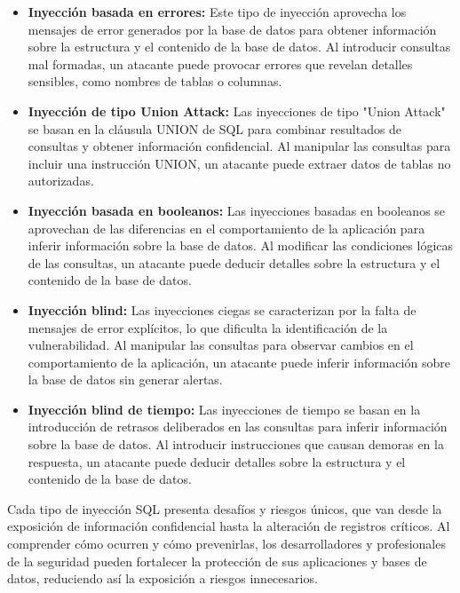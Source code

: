 \documentclass[a4paper,12pt]{article}
\begin{document}
    \begin{itemize}
        \item \textbf{Inyección basada en errores:} Este tipo de inyección aprovecha los mensajes de error generados por la base de datos para obtener información sobre la estructura y el contenido de la base de datos. Al introducir consultas mal formadas, un atacante puede provocar errores que revelan detalles sensibles, como nombres de tablas o columnas.
        \vspace{0,2cm}
        \item \textbf{Inyección de tipo Union Attack:} Las inyecciones de tipo "Union Attack" se basan en la cláusula UNION de SQL para combinar resultados de consultas y obtener información confidencial. Al manipular las consultas para incluir una instrucción UNION, un atacante puede extraer datos de tablas no autorizadas.
        \vspace{0,2cm}
        \item \textbf{Inyección basada en booleanos:} Las inyecciones basadas en booleanos se aprovechan de las diferencias en el comportamiento de la aplicación para inferir información sobre la base de datos. Al modificar las condiciones lógicas de las consultas, un atacante puede deducir detalles sobre la estructura y el contenido de la base de datos.
        \vspace{0,2cm}
        \item \textbf{Inyección blind:} Las inyecciones ciegas se caracterizan por la falta de mensajes de error explícitos, lo que dificulta la identificación de la vulnerabilidad. Al manipular las consultas para observar cambios en el comportamiento de la aplicación, un atacante puede inferir información sobre la base de datos sin generar alertas.
        \vspace{0,2cm}
        \item \textbf{Inyección blind de tiempo:} Las inyecciones de tiempo se basan en la introducción de retrasos deliberados en las consultas para inferir información sobre la base de datos. Al introducir instrucciones que causan demoras en la respuesta, un atacante puede deducir detalles sobre la estructura y el contenido de la base de datos.
    \end{itemize}
    \vspace{0,5cm}

    Cada tipo de inyección SQL presenta desafíos y riesgos únicos, que van desde la exposición de información confidencial hasta la alteración de registros críticos. Al comprender cómo ocurren y cómo prevenirlas, los desarrolladores y profesionales de la seguridad pueden fortalecer la protección de sus aplicaciones y bases de datos, reduciendo así la exposición a riesgos innecesarios.
\end{document}
